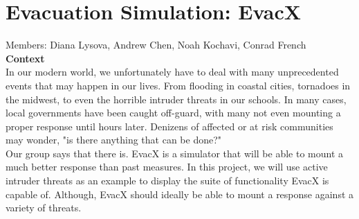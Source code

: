 \documentclass[12pt]{article}
\begin{document}
\section*{\huge Evacuation Simulation: EvacX}
Members: Diana Lysova, Andrew Chen, Noah Kochavi, Conrad French \\ [5pt]
\textbf{Context} \\
\hspace*{6mm} In our modern world, we unfortunately have to deal with many unprecedented events that may happen in our lives. From flooding in coastal cities, tornadoes in the midwest, to even the horrible intruder threats in our schools. In many cases, local governments have been caught off-guard, with many not even mounting a proper response until hours later. Denizens of affected or at risk communities may wonder, "is there anything that can be done?" \\[5pt]
\hspace*{6mm} Our group says that there is. EvacX is a simulator that will be able to mount a much better response than past measures. In this project, we will use active intruder threats as an example to display the suite of functionality EvacX is capable of. Although, EvacX should ideally be able to mount a response against a variety of threats.
\end{document}

